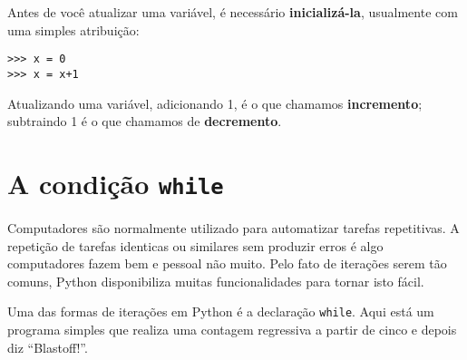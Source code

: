 Antes de você atualizar uma variável, é necessário {\bf inicializá-la},
usualmente com uma simples atribuição:


\beforeverb
\begin{verbatim}
>>> x = 0
>>> x = x+1
\end{verbatim}
\afterverb
%

%
Atualizando uma variável, adicionando 1, é o que chamamos {\bf incremento};
subtraindo 1 é o que chamamos de {\bf decremento}.


\section{A condição {\tt while}}




Computadores são normalmente utilizado para automatizar tarefas repetitivas.
A repetição de tarefas identicas ou similares sem produzir erros é algo
computadores fazem bem e pessoal não muito. Pelo fato de iterações serem tão
comuns, Python disponibiliza muitas funcionalidades para tornar isto fácil.


Uma das formas de iterações em Python é a declaração {\tt while}. Aqui está
um programa simples que realiza uma contagem regressiva a partir de cinco e
depois diz ``Blastoff!''.

